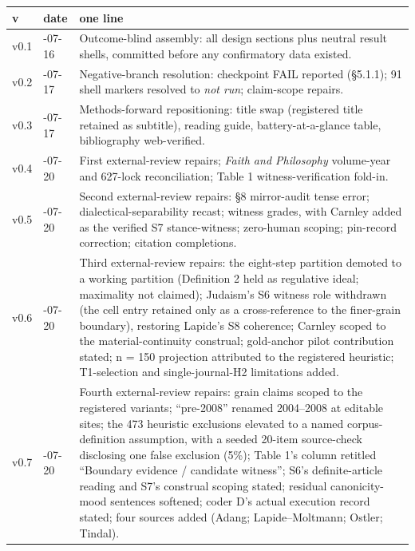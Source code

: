 \begin{longtable}[]{@{}
  >{\raggedright\arraybackslash}p{}
  >{\raggedright\arraybackslash}p{}
  >{\raggedright\arraybackslash}p{}@{}}
\toprule\noalign{}
\begin{minipage}[b]{\linewidth}\raggedright
v
\end{minipage} & \begin{minipage}[b]{\linewidth}\raggedright
date
\end{minipage} & \begin{minipage}[b]{\linewidth}\raggedright
one line
\end{minipage} \\
\midrule\noalign{}
\endhead
\bottomrule\noalign{}
\endlastfoot
v0.1 & 2026-07-16 & Outcome-blind assembly: all design sections plus neutral result shells, committed before any confirmatory data existed. \\
v0.2 & 2026-07-17 & Negative-branch resolution: checkpoint FAIL reported (\S{}5.1.1); 91 shell markers resolved to \emph{not run}; claim-scope repairs. \\
v0.3 & 2026-07-17 & Methods-forward repositioning: title swap (registered title retained as subtitle), reading guide, battery-at-a-glance table, bibliography web-verified. \\
v0.4 & 2026-07-20 & First external-review repairs; \emph{Faith and Philosophy} volume-year and 627-lock reconciliation; Table 1 witness-verification fold-in. \\
v0.5 & 2026-07-20 & Second external-review repairs: \S{}8 mirror-audit tense error; dialectical-separability recast; witness grades, with Carnley added as the verified S7 stance-witness; zero-human scoping; pin-record correction; citation completions. \\
v0.6 & 2026-07-20 & Third external-review repairs: the eight-step partition demoted to a working partition (Definition 2 held as regulative ideal; maximality not claimed); Judaism's S6 witness role withdrawn (the cell entry retained only as a cross-reference to the finer-grain boundary), restoring Lapide's S8 coherence; Carnley scoped to the material-continuity construal; gold-anchor pilot contribution stated; n = 150 projection attributed to the registered heuristic; T1-selection and single-journal-H2 limitations added. \\
v0.7 & 2026-07-20 & Fourth external-review repairs: grain claims scoped to the registered variants; ``pre-2008'' renamed 2004--2008 at editable sites; the 473 heuristic exclusions elevated to a named corpus-definition assumption, with a seeded 20-item source-check disclosing one false exclusion (5\%); Table 1's column retitled ``Boundary evidence / candidate witness''; S6's definite-article reading and S7's construal scoping stated; residual canonicity-mood sentences softened; coder D's actual execution record stated; four sources added (Adang; Lapide--Moltmann; Ostler; Tindal). \\

\end{longtable}
